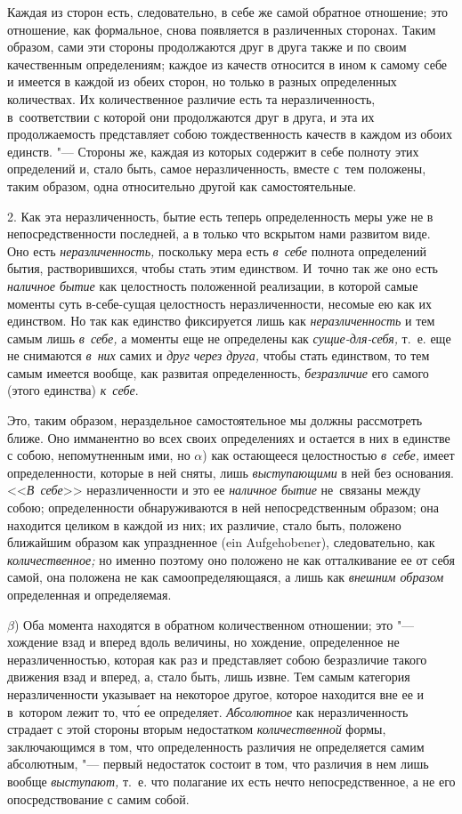 Каждая из сторон есть, следовательно, в себе же самой обратное отношение; это
отношение, как формальное, снова появляется в различенных сторонах. Таким
образом, сами эти стороны продолжаются друг в друга также и по своим
качественным определениям; каждое из качеств относится в ином к самому себе и
имеется в каждой из обеих сторон, но только в разных определенных количествах.
Их количественное различие есть та неразличенность, в~соответствии с которой
они продолжаются друг в друга, и эта их продолжаемость представляет собою
тождественность качеств в каждом из обоих единств. "--- Стороны же, каждая из
которых содержит в себе полноту этих определений и, стало быть, самое
неразличенность, вместе с~тем положены, таким образом, одна относительно
другой как самостоятельные.

2. Как эта неразличенность, бытие есть теперь определенность меры уже не в
непосредственности последней, а в только что вскрытом нами развитом виде. Оно
есть {\em неразличенность,} поскольку мера есть {\em в~себе} полнота
определений бытия, растворившихся, чтобы стать этим единством. И~точно так же
оно есть {\em наличное бытие} как целостность положенной реализации, в которой
самые моменты суть в-себе-сущая целостность неразличенности, несомые ею как их
единством. Но так как единство фиксируется лишь как {\em неразличенность} и тем
самым лишь {\em в~себе,} а моменты еще не определены как {\em сущие-для-себя,}
т.~е. еще не снимаются {\em в~них} самих и {\em друг через друга,} чтобы стать
единством, то тем самым имеется вообще, как развитая определенность, {\em
безразличие} его самого (этого единства) {\em к~себе}.

Это, таким образом, нераздельное самостоятельное мы должны рассмотреть ближе.
Оно имманентно во всех своих определениях и остается в них в единстве с собою,
непомутненным ими, но $\alpha$) как остающееся целостностью {\em в~себе,} имеет
определенности, которые в ней сняты, лишь {\em выступающими} в ней без
основания. <<{\em В~себе}>> неразличенности и это ее {\em наличное бытие}
не~связаны между собою; определенности обнаруживаются в ней непосредственным
образом; она находится целиком в каждой из них; их различие, стало быть,
положено ближайшим образом как упраздненное (ein Auf\-ge\-ho\-be\-ner),
следовательно, как {\em количественное;} но именно поэтому оно положено не как
отталкивание ее от себя самой, она положена не как самоопределяющаяся, а лишь
как {\em внешним образом} определенная и определяемая.

$\beta$) Оба момента находятся в обратном количественном отношении; это "---
хождение взад и вперед вдоль величины, но хождение, определенное не
неразличенностью, которая как раз и представляет собою безразличие такого
движения взад и вперед, а, стало быть, лишь извне. Тем самым категория
неразличенности указывает на некоторое другое, которое находится вне ее и
в~котором лежит то, чт\'{о} ее определяет. {\em Абсолютное} как неразличенность
страдает с этой стороны вторым недостатком {\em количественной} формы,
заключающимся в том, что определенность различия не определяется самим
абсолютным, "--- первый недостаток состоит в том, что различия в нем лишь
вообще {\em выступают,} т.~е. что полагание их есть нечто непосредственное, а
не его опосредствование с самим собой.

